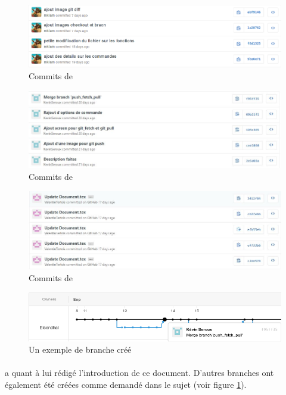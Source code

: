 \documentclass[11pt,canadien]{article}
\begin{document}
\begin{figure}[h]
	\centering
	\includegraphics[width=\textwidth]{images/commit_karen.png}
	\caption{Commits de \karen}
\end{figure}

\begin{figure}[h]
	\centering
	\includegraphics[width=\textwidth]{images/commit_kevin.JPG}
	\caption{Commits de \kevin}
\end{figure}

\begin{figure}[h]
	\centering
	\includegraphics[width=\textwidth]{images/commit_valentin.JPG}
	\caption{Commits de \valentin}
\end{figure}


\begin{figure}[h]
	\centering
	\includegraphics[width=\textwidth]{images/merge_branche.png}
	\caption{Un exemple de branche créé}
	\label{fig:Branche}
\end{figure}

\paragraph{}\antoine a quant à lui rédigé l'introduction de ce document. D'autres branches ont également été créées comme demandé dans le sujet (voir figure \ref{fig:Branche}).
\end{document}
